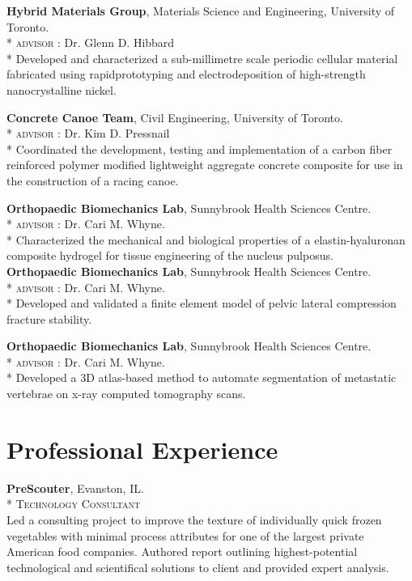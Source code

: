 \textbf{Hybrid Materials Group}, Materials Science and Engineering, University of Toronto.\\*
\textsc{advisor} : Dr. Glenn D. Hibbard\\*
Developed and characterized a sub-millimetre scale periodic cellular material fabricated using rapidprototyping and electrodeposition of high-strength nanocrystalline nickel.

\textbf{Concrete Canoe Team}, Civil Engineering, University of Toronto.\\*
\textsc{advisor} : Dr. Kim D. Pressnail\\*
Coordinated the development, testing and implementation of a carbon fiber reinforced polymer modified lightweight aggregate concrete composite for use in the construction of a racing canoe.

\textbf{Orthopaedic Biomechanics Lab}, Sunnybrook Health Sciences Centre.\\*
\textsc{advisor} : Dr. Cari M. Whyne.\\*
Characterized the mechanical and biological properties of a elastin-hyaluronan composite hydrogel for tissue engineering of the nucleus pulposus.\\[0.3cm]
\textbf{Orthopaedic Biomechanics Lab}, Sunnybrook Health Sciences Centre.\\*
\textsc{advisor} : Dr. Cari M. Whyne.\\*
Developed and validated a finite element model of pelvic lateral compression fracture stability.

\textbf{Orthopaedic Biomechanics Lab}, Sunnybrook Health Sciences Centre.\\*
\textsc{advisor} : Dr. Cari M. Whyne.\\*
Developed a 3D atlas-based method to automate segmentation of metastatic vertebrae on x-ray computed tomography scans.
\endgroup

\section*{Professional Experience}
\textbf{PreScouter}, Evanston, IL.\\*
\begingroup\setlength{\parskip}{0.2cm}
\textsc{Technology Consultant}\\
Led a consulting project to improve the texture of individually quick frozen vegetables with minimal process attributes for one of the largest private American food companies. Authored report outlining highest-potential technological and scientifical solutions to client and provided expert analysis.

